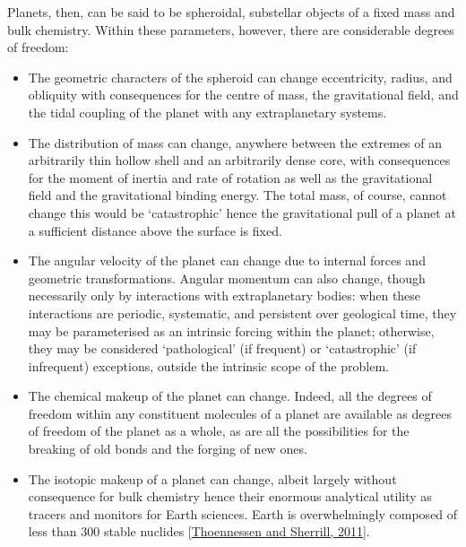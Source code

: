 \documentclass[letterpaper,10pt,english]{jupyterBook}
\begin{document}
\sphinxAtStartPar
Planets, then, can be said to be spheroidal, sub\sphinxhyphen{}stellar objects of a fixed mass and bulk chemistry. Within these parameters, however, there are considerable degrees of freedom:
\begin{itemize}
\item {} 
\sphinxAtStartPar
The geometric characters of the spheroid can change \sphinxhyphen{} eccentricity, radius, and obliquity \sphinxhyphen{} with consequences for the centre of mass, the gravitational field, and the tidal coupling of the planet with any extra\sphinxhyphen{}planetary systems.

\item {} 
\sphinxAtStartPar
The distribution of mass can change, anywhere between the extremes of an arbitrarily thin hollow shell and an arbitrarily dense core, with consequences for the moment of inertia and rate of rotation as well as the gravitational field and the gravitational binding energy. The total mass, of course, cannot change \sphinxhyphen{} this would be ‘catastrophic’ \sphinxhyphen{} hence the gravitational pull of a planet at a sufficient distance above the surface is fixed.

\item {} 
\sphinxAtStartPar
The angular velocity of the planet can change due to internal forces and geometric transformations. Angular momentum can also change, though necessarily only by interactions with extra\sphinxhyphen{}planetary bodies: when these interactions are periodic, systematic, and persistent over geological time, they may be parameterised as an intrinsic forcing within the planet; otherwise, they may be considered ‘pathological’ (if frequent) or ‘catastrophic’ (if infrequent) exceptions, outside the intrinsic scope of the problem.

\item {} 
\sphinxAtStartPar
The chemical makeup of the planet can change. Indeed, all the degrees of freedom within any constituent molecules of a planet are available as degrees of freedom of the planet as a whole, as are all the possibilities for the breaking of old bonds and the forging of new ones.

\item {} 
\sphinxAtStartPar
The isotopic makeup of a planet can change, albeit largely without consequence for bulk chemistry \sphinxhyphen{} hence their enormous analytical utility as tracers and monitors for Earth sciences. Earth is overwhelmingly composed of less than 300 stable nuclides {[}\hyperlink{cite.references:id347}{Thoennessen and Sherrill, 2011}{]}.


\end{itemize}
\end{document}

